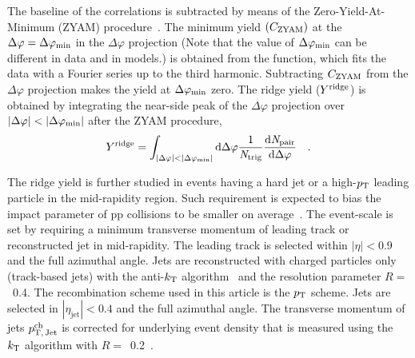The baseline of the correlations is subtracted by means of the Zero-Yield-At-Minimum (ZYAM) procedure~\cite{Ajitanand:2005jj}. The minimum yield $(C_{\rm{ZYAM}})$ at the $\Delta\varphi=\Delta\varphi_{\rm{min}}$ in the $\Delta\varphi$ projection (Note that the value of $\Delta\varphi_{\rm{min}}$ can be different in data and in models.) is obtained from the function, which fits the data with a Fourier series up to the third harmonic. Subtracting $C_{\rm{ZYAM}}$ from the $\Delta\varphi$ projection makes the yield at $\Delta\varphi_{\rm{min}}$ zero. The ridge yield ($Y^{\rm{ridge}}$) is obtained by integrating the near-side peak of the $\Delta\varphi$ projection over $|\Delta\varphi|<|\Delta\varphi_{\rm{min}}|$ after the ZYAM procedure,
\begin{eqnarray}
Y^{\rm{ridge}} = \int_{|\Delta \varphi| < |\Delta\varphi_{\rm{min}}| } \rm{d} \Delta\varphi \frac{1}{\it{N}_{\rm{trig}}} \frac{ \rm{d}\it{}N_{\rm{pair}} }{ \rm{d}\Delta\varphi } \quad.
\end{eqnarray}

The ridge yield is further studied in events having a hard jet or a high-$p_\mathrm{T}$ leading particle in the mid-rapidity region. Such requirement is expected to bias the impact parameter of pp collisions to be smaller on average~\cite{Sjostrand:1986ep,Frankfurt:2010ea}.
The event-scale is set by requiring a minimum transverse momentum of leading track or reconstructed jet in mid-rapidity. The leading track is selected within $|\eta|<0.9$ and the full azimuthal angle. Jets are reconstructed with charged particles only (track-based jets) with the anti-$k_{\rm{T}}$ algorithm~\cite{Cacciari2008:FASTJET,Cacciari2012:FASTJET} and the resolution parameter $R=$~0.4. The recombination scheme used in this article is the $p_\mathrm{T}$ scheme. Jets are selected in $|\eta_\mathrm{jet}|<0.4$ and the full azimuthal angle. The transverse momentum of jets $p_\mathrm{T,\,Jet}^\mathrm{ch}$ is corrected for underlying event density that is measured using the $k_{\rm{T}}$ algorithm with $R=$~0.2~\cite{ALICE2019:KTJETSub}. 

